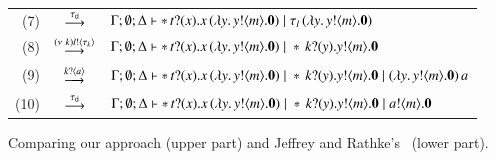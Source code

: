 \begin{figure}[!t]
\begin{tabular}{rcl}
		(7) &$\stackrel{\tau_{\mathsf{d}}}{\longrightarrow}$& $\Gamma; \emptyset; \Delta \vdash \ast\,{} t ? (x) . x\,(\lambda y.\,y ! \langle m \rangle . \mathbf{0}) \;|\; \tau_l\,(\lambda y.\,y ! \langle m \rangle . \mathbf{0})$\\
		(8) &$\stackrel{(\nu\ k) l ! \langle \tau_k \rangle}{\longrightarrow}$& $\Gamma; \emptyset; \Delta \vdash \ast\,{} t ? (x) . x\,(\lambda y.\,y ! \langle m \rangle . \mathbf{0}) \;|\; \ast\,{} k ? (y) . y ! \langle m \rangle . \mathbf{0} $\\
		(9) &$\stackrel{k ? \langle a \rangle}{\longrightarrow}$& $\Gamma; \emptyset; \Delta \vdash \ast\,{} t ? (x) . x\,(\lambda y.\,y ! \langle m \rangle . \mathbf{0}) \;|\; \ast\,{} k ? (y) . y ! \langle m \rangle . \mathbf{0} \;|\; (\lambda y.\,y ! \langle m \rangle . \mathbf{0})\,a$\\
		(10) &$\stackrel{\tau_{\mathsf{d}}}{\longrightarrow}$& $\Gamma; \emptyset; \Delta \vdash \ast\,{} t ? (x) . x\,(\lambda y.\,y ! \langle m \rangle . \mathbf{0}) \;|\; \ast\,{} k ? (y) . y ! \langle m \rangle . \mathbf{0} \;|\; a ! \langle m \rangle . \mathbf{0}$
	\end{tabular}
\caption{Comparing our approach (upper part) and Jeffrey and Rathke's~\cite{JeffreyR05} (lower part).\label{f:comparison} }
\end{figure}

